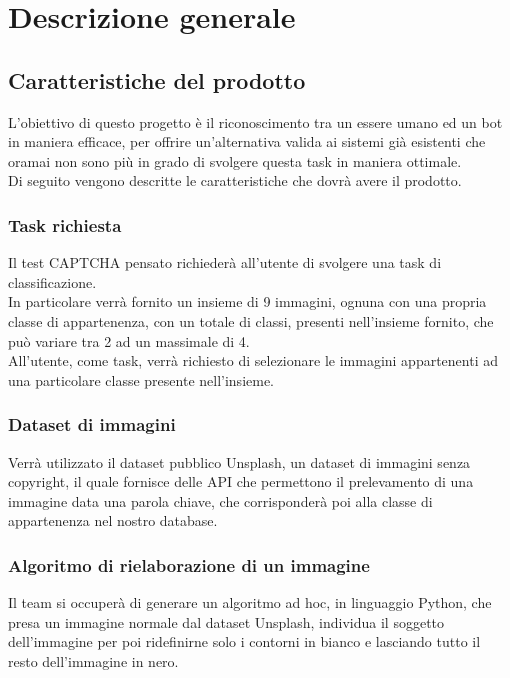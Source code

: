 \section{Descrizione generale}

\subsection{Caratteristiche del prodotto}
L'obiettivo di questo progetto è il riconoscimento tra un essere umano ed un bot in maniera efficace, per offrire un'alternativa valida ai sistemi già esistenti che oramai non sono più in grado di svolgere questa task in maniera ottimale.\\

Di seguito vengono descritte le caratteristiche che dovrà avere il prodotto.

\subsubsection{Task richiesta}
Il test CAPTCHA pensato richiederà all'utente di svolgere una task di classificazione.\\
In particolare verrà fornito un insieme di 9 immagini, ognuna con una propria classe di appartenenza, con un totale di classi, presenti nell'insieme fornito, che può variare tra 2 ad un massimale di 4.\\
All'utente, come task, verrà richiesto di selezionare le immagini appartenenti ad una particolare classe presente nell'insieme.

\subsubsection{Dataset di immagini}
Verrà utilizzato il dataset pubblico Unsplash, un dataset di immagini senza copyright, il quale fornisce delle API che permettono il prelevamento di una immagine data una parola chiave, che corrisponderà poi alla classe di appartenenza nel nostro database.

\subsubsection{Algoritmo di rielaborazione di un immagine}
Il team si occuperà di generare un algoritmo ad hoc, in linguaggio Python, che presa un immagine normale dal dataset Unsplash, individua il soggetto dell'immagine per poi ridefinirne solo i contorni in bianco e lasciando tutto il resto dell'immagine in nero.  

